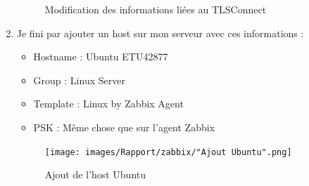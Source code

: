 \documentclass[a4paper]{article}
\begin{document}
\begin{enumerate}
\begin{figure}[H]
    \caption{Modification des informations liées au TLSConnect}
  \end{figure}
  \item Je fini par ajouter un host sur mon serveur avec ces informations :
  \begin{itemize}
    \item Hostname : Ubuntu ETU42877
    \item Group : Linux Server
    \item Template : Linux by Zabbix Agent
    \item PSK : Même chose que sur l'agent Zabbix
  \end{itemize}
  \begin{figure}[H]
    \centering
    \texttt{[image: images/Rapport/zabbix/"Ajout Ubuntu".png]}
    \caption{Ajout de l'host Ubuntu}
  \end{figure}
\end{enumerate}
\end{document}
